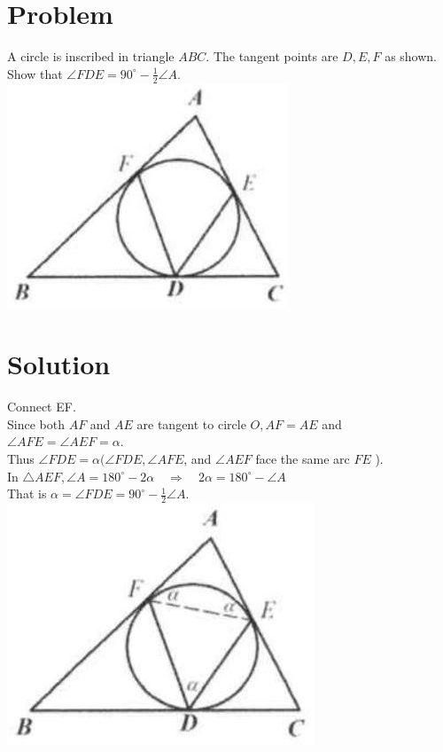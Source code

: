 \documentclass{article}
\begin{document}
\section*{Problem}
A circle is inscribed in triangle \(A B C\). The tangent points are \(D, E, F\) as shown. Show that \(\angle F D E=90^{\circ}-\frac{1}{2} \angle A\).\\
\centering
\includegraphics[width=\textwidth]{images/169(2).jpg}

\section*{Solution}
Connect EF.\\
Since both \(A F\) and \(A E\) are tangent to circle \(O, A F=A E\) and \(\angle A F E=\angle A E F=\alpha\).\\
Thus \(\angle F D E=\alpha(\angle F D E, \angle A F E\), and \(\angle A E F\) face the same arc \(F E\) ).\\
In \(\triangle A E F, \angle A=180^{\circ}-2 \alpha \quad \Rightarrow \quad 2 \alpha=180^{\circ}-\angle A\)\\
That is \(\alpha=\angle F D E=90^{\circ}-\frac{1}{2} \angle A\).\\
\centering
\includegraphics[width=\textwidth]{images/171.jpg}
\end{document}
